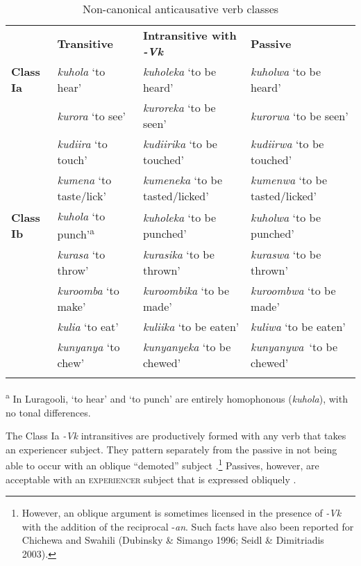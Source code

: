 \documentclass[output=paper]{langsci/langscibook}
\begin{document}
\begin{table}
\caption{Non-canonical anticausative verb classes}
\label{tab:4}

\begin{tabularx}{\textwidth}{XXXX} & \textbf{Transitive} & \textbf{Intransitive with }\textbf{\textit{-Vk}} & \textbf{Passive}\\
\lsptoprule
\textbf{Class Ia} & \textit{kuhola} ‘to hear’ & \textit{kuholeka }‘to be heard’ & \textit{kuholwa} ‘to be heard’\\
& \textit{kurora} ‘to see’ & \textit{kuroreka} ‘to be seen’ & \textit{kurorwa} ‘to be seen’\\
\hhline{~---} & \textit{kudiira} ‘to touch’ & \textit{kudiirika} ‘to be touched’ & \textit{kudiirwa} ‘to be touched’\\
\hhline{~---} & \textit{kumena} ‘to taste/lick’ & \textit{kumeneka} ‘to be tasted/licked’ & \textit{kumenwa} ‘to be tasted/licked’\\
\textbf{Class Ib} & \textit{kuhola} ‘to punch’\textsuperscript{a} & \textit{kuholeka} ‘to be punched’ & \textit{kuholwa} ‘to be punched’\\
& \textit{kurasa} ‘to throw’ & \textit{kurasika} ‘to be thrown’ & \textit{kuraswa} ‘to be thrown’\\
\hhline{~---} & \textit{kuroomba} ‘to make’ & \textit{kuroombika} ‘to be made’ & \textit{kuroombwa} ‘to be made’\\
\hhline{~---} & \textit{kulia} ‘to eat’ & \textit{kuliika} ‘to be eaten’ & \textit{kuliwa} ‘to be eaten’\\
\hhline{~---} & \textit{kunyanya} ‘to chew’ & \textit{kunyanyeka} ‘to be chewed’ & \textit{kunyanywa}~‘to be chewed’\\
\hhline{~---}
\lspbottomrule
\end{tabularx}
\textsuperscript{a }In Luragooli, ‘to hear’ and ‘to punch’\textit{ }are entirely homophonous (\textit{kuhola}), with no tonal differences.

\end{table}

The Class Ia \textit{-Vk }intransitives are productively formed with any verb that takes an experiencer subject. They pattern separately from the passive in not being able to occur with an oblique “demoted” subject .\footnote{ However, an oblique argument is sometimes licensed in the presence of \textit{-Vk} with the addition of the reciprocal -\textit{an}. Such facts have also been reported for Chichewa and Swahili (Dubinsky \& Simango 1996; Seidl \& Dimitriadis 2003).} Passives, however, are acceptable with an \textsc{experiencer} subject that is expressed obliquely .
\end{document}
